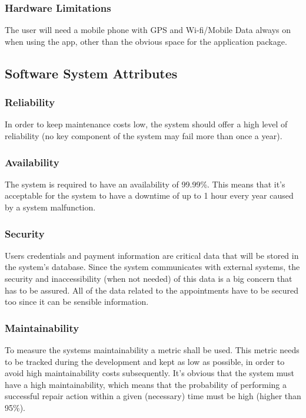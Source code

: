 \documentclass[12pt]{article}
\begin{document}
\subsubsection{Hardware Limitations}
The user will need a mobile phone with GPS and Wi-fi/Mobile Data always on when using the app, other than the obvious space for the application package.

\subsection{Software System Attributes}

\subsubsection{Reliability}
In order to keep maintenance costs low, the system should offer a high level of reliability (no key component of the system may fail more than once a year). 

\subsubsection{Availability}
The system is required to have an availability of 99.99\%. This means that it’s acceptable for the system to have a downtime of up to 1 hour every year caused by a system malfunction.

\subsubsection{Security}
Users credentials and payment information are critical data that will be stored in the system's database. Since the system communicates with external systems, the security and inaccessibility (when not needed) of this data is a big concern that has to be assured. All of the data related to the appointments have to be secured too since it can be sensible information. 

\subsubsection{Maintainability}
To measure the systems maintainability a metric shall be used. This metric needs to be tracked during the development and kept as low as possible, in order to avoid high maintainability costs subsequently. It's obvious that the system must have a high maintainability, which means that the probability of performing a successful repair action within a given (necessary) time must be high (higher than 95\%).
\end{document}
